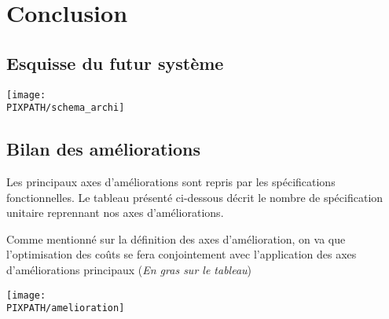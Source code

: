 \section{Conclusion}

\subsection{Esquisse du futur système}

\begin{center}
\texttt{[image: \\PIXPATH/schema\_archi]}
\end{center}

\subsection{Bilan des améliorations}

Les principaux axes d'améliorations sont repris par les spécifications
fonctionnelles. Le tableau présenté ci-dessous décrit le nombre de
spécification unitaire reprennant nos axes d'améliorations. 

Comme mentionné sur la définition des axes d'amélioration, on va que
l'optimisation des coûts se fera conjointement avec l'application des axes
d'améliorations principaux (\textit{En gras sur le tableau})

\begin{center}
\texttt{[image: \\PIXPATH/amelioration]}
\end{center}



